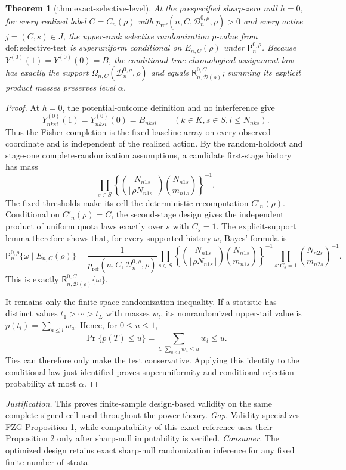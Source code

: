 \documentclass{article}
\newtheorem{theorem}{Theorem}
\begin{document}
\begin{theorem}[thm:exact-selective-level]\label{thm:exact-selective-level}
At the prespecified sharp-zero null \(h=0\), for every realized label \(C=C_n(\rho)\) with \(p_{\mathrm{ref}}(n,C,\mathcal D_n^{0,\rho},\rho)>0\) and every active \(j=(C,s)\in J\), the upper-rank selective randomization \(p\)-value from \(\mathrm{def{:}selective\mbox{-}test}\) is superuniform conditional on \(E_{n,C}(\rho)\) under \(\mathsf P_n^{0,\rho}\). Because \(Y^{(0)}(1)=Y^{(0)}(0)=B\), the conditional true chronological assignment law has exactly the support \(\Omega_{n,C}(\mathcal D_n^{0,\rho},\rho)\) and equals \(\mathsf R_{n,\mathcal D(\rho)}^{0,C}\); summing its explicit product masses preserves level \(\alpha\).
\end{theorem}
\begin{proof}
At \(h=0\), the potential-outcome definition and no interference give
\[
Y^{(0)}_{nksi}(1)=Y^{(0)}_{nksi}(0)=B_{nksi}
\qquad(k\in K, s\in S, i\le N_{nks}).
\]
Thus the Fisher completion is the fixed baseline array on every observed coordinate and is independent of the realized action.  By the random-holdout and stage-one complete-randomization assumptions, a candidate first-stage history has mass
\[
\prod_{s\in S}
\left\{
\binom{N_{n1s}}{\lfloor\rho N_{n1s}\rfloor}
\binom{N_{n1s}}{m_{n1s}}
\right\}^{-1}.
\]
The fixed thresholds make its cell the deterministic recomputation \(C'_n(\rho)\).  Conditional on \(C'_n(\rho)=C\), the second-stage design gives the independent product of uniform quota laws exactly over \(s\) with \(C_s=1\).  The explicit-support lemma therefore shows that, for every supported history \(\omega\), Bayes' formula is
\[
\mathsf P_n^{0,\rho}\{\omega\mid E_{n,C}(\rho)\}
=\frac{1}{p_{\mathrm{ref}}(n,C,\mathcal D_n^{0,\rho},\rho)}
\prod_{s\in S}
\left\{
\binom{N_{n1s}}{\lfloor\rho N_{n1s}\rfloor}
\binom{N_{n1s}}{m_{n1s}}
\right\}^{-1}
\prod_{s:C_s=1}\binom{N_{n2s}}{m_{n2s}}^{-1}.
\]
This is exactly \(\mathsf R_{n,\mathcal D(\rho)}^{0,C}\{\omega\}\).

It remains only the finite-space randomization inequality.  If a statistic has distinct values \(t_1>\cdots>t_L\) with masses \(w_l\), its nonrandomized upper-tail value is \(p(t_l)=\sum_{a\le l}w_a\).  Hence, for \(0\le u\le1\),
\[
\Pr\{p(T)\le u\}
=\sum_{l:\,\sum_{a\le l}w_a\le u}w_l\le u.
\]
Ties can therefore only make the test conservative.  Applying this identity to the conditional law just identified proves superuniformity and conditional rejection probability at most \(\alpha\).
\end{proof}
\par\smallskip\noindent \textit{Justification.} This proves finite-sample design-based validity on the same complete signed cell used throughout the power theory. \textit{Gap.} Validity specializes FZG Proposition 1, while computability of this exact reference uses their Proposition 2 only after sharp-null imputability is verified. \textit{Consumer.} The optimized design retains exact sharp-null randomization inference for any fixed finite number of strata.
\end{document}
